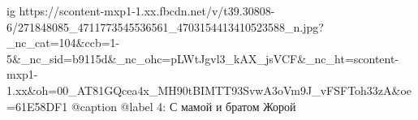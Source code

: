  
 
 
 
 

\ifcmt
  ig https://scontent-mxp1-1.xx.fbcdn.net/v/t39.30808-6/271848085_4711773545536561_4703154413410523588_n.jpg?_nc_cat=104&ccb=1-5&_nc_sid=b9115d&_nc_ohc=pLWtJgvl3_kAX_jsVCF&_nc_ht=scontent-mxp1-1.xx&oh=00_AT81GQcea4x_MH90tBIMTT93SvwA3oVm9J_vFSFToh33zA&oe=61E58DF1
  @caption @label 4: С мамой и братом Жорой
\fi
